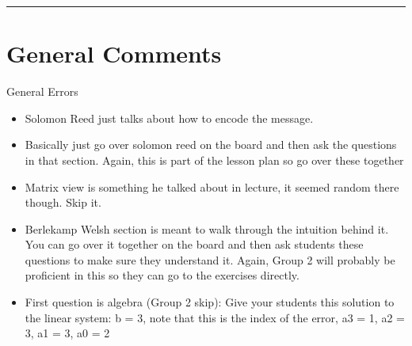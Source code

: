 \documentclass{exam}
\title{}
\date{Berlekamp-Welsh, Countability, Self Reference, Counting}
\begin{document}
\maketitle
\rule{\textwidth}{0.15em}
\fontsize{12}{15}\selectfont
\thispagestyle{empty}


\section{General Comments}
\item General Errors
\begin{itemize}
	\item Solomon Reed just talks about how to encode the message.
	\item Basically just go over solomon reed on the board and then ask the questions in that section. Again, this is part of the lesson plan so go over these together
	\item Matrix view is something he talked about in lecture, it seemed random there though. Skip it.
	\item Berlekamp Welsh section is meant to walk through the intuition behind it. You can go over it together on the board and then ask students these questions to make sure they understand it. Again, Group 2 will probably be proficient in this so they can go to the exercises directly.
	\item First question is algebra (Group 2 skip): Give your students this solution to the linear system: b = 3, note that this is the index of the error, a3 = 1, a2 = 3, a1 = 3, a0 = 2
\end{itemize}
\end{document}
